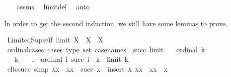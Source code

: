 \begin{isabellebody}
%
\isadelimproof
\ \ %
\endisadelimproof
%
\isatagproof
{}\isamarkupfalse%
\ assms\ \isamarkupfalse%
\ limit{\isacharunderscore}{\kern0pt}def\ \isamarkupfalse%
\ auto%
\endisatagproof
{\isafoldproof}%
%
\isadelimproof
%
\endisadelimproof
%
\begin{isamarkuptext}%
In order to get the second induction, we still have some lemmas to prove.%
\end{isamarkuptext}\isamarkuptrue%
\isamarkupfalse%
\ Limit{\isacharunderscore}{\kern0pt}eq{\isacharunderscore}{\kern0pt}Sup{\isacharunderscore}{\kern0pt}self{\isacharcolon}{\kern0pt}\ {\isachardoublequoteopen}limit\ X\ {\isasymLongrightarrow}\ {\isasymUnion}X\ {\isacharequal}{\kern0pt}\ X{\isachardoublequoteclose}\isanewline
%
\isadelimproof
\ \ %
\endisadelimproof
%
\isatagproof
{}\isamarkupfalse%
%
\endisatagproof
{\isafoldproof}%
%
\isadelimproof
\isanewline
%
\endisadelimproof
\isanewline
{}\isamarkupfalse%
\ ordinal{\isacharunderscore}{\kern0pt}cases\ {\isacharbrackleft}{\kern0pt}cases\ type{\isacharcolon}{\kern0pt}\ set{\isacharcomma}{\kern0pt}\ case{\isacharunderscore}{\kern0pt}names\ {}\ succ\ limit{\isacharbrackright}{\kern0pt}{\isacharcolon}{\kern0pt}\isanewline
\ \ \ {\isachardoublequoteopen}ordinal\ k{\isachardoublequoteclose}\isanewline
\ \ \ {\isachardoublequoteopen}k\ {\isacharequal}{\kern0pt}\ {}{\isachardoublequoteclose}\ {\isacharbar}{\kern0pt}\ l\ \ {\isachardoublequoteopen}ordinal\ l{\isachardoublequoteclose}\ {\isachardoublequoteopen}succ\ l\ {\isacharequal}{\kern0pt}\ k{\isachardoublequoteclose}\ {\isacharbar}{\kern0pt}\ {\isachardoublequoteopen}limit\ k{\isachardoublequoteclose}\isanewline
%
\isadelimproof
\ \ %
\endisadelimproof
%
\isatagproof
{}\isamarkupfalse%
%
\endisatagproof
{\isafoldproof}%
%
\isadelimproof
\isanewline
%
\endisadelimproof
\isanewline
{}\isamarkupfalse%
\ elts{\isacharunderscore}{\kern0pt}succ\ {\isacharbrackleft}{\kern0pt}simp{\isacharbrackright}{\kern0pt}{\isacharcolon}{\kern0pt}\ {\isachardoublequoteopen}{\isacharbraceleft}{\kern0pt}xx\ {\isacharbar}{\kern0pt}\ xx\ {\isasymin}\ {\isacharparenleft}{\kern0pt}succ\ x{\isacharparenright}{\kern0pt}{\isacharbraceright}{\kern0pt}\ {\isacharequal}{\kern0pt}\ insert\ x\ {\isacharbraceleft}{\kern0pt}xx\ {\isacharbar}{\kern0pt}\ xx\ {\isasymin}\ x{\isacharbraceright}{\kern0pt}{\isachardoublequoteclose}\isanewline
%
\isadelimproof
\ \ %
\endisadelimproof

\end{isabellebody}
